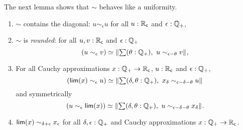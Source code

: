 The next lemma shows that $\sim$ behaves like a uniformity.

\begin{lem}\label{RC-sim-uniformity-properties}
  \mbox{}
  \begin{enumerate}

  \item \label{RC-sim-diagonal}
    $\sim$ contains the diagonal:
    $u \sim_\epsilon u$ for all $u : \mathbb{R}_\mathsf{c}$ and $\epsilon : \mathbb{Q}_{+}$,

  \item \label{RC-sim-rounded}
    $\sim$ is \emph{rounded}:
    for all $u, v : \mathbb{R}_\mathsf{c}$ and $\epsilon : \mathbb{Q}_{+}$
    \begin{equation*}
      \eqv{
        (u \sim_\epsilon v)
      }{
        \brck{\sm{\theta : \Qp} u \sim_{\epsilon - \theta} v}
      },
    \end{equation*}

  \item \label{RC-sim-lim-rounded}
    For all Cauchy approximations $x : \mathbb{Q}_{+} \to \mathbb{R}_\mathsf{c}$, $u : \mathbb{R}_\mathsf{c}$ and $\epsilon : \mathbb{Q}_{+}$,
    \begin{equation} \label{eq:RC-sim-lim-rounded-i}
      \eqv{
        (\rclim(x) \sim_\epsilon u)
      }{
        \brck{\sm{\delta, \theta : \Qp} x_\delta \sim_{\epsilon - \delta - \theta} u}
      }
    \end{equation}
    and symmetrically
    \begin{equation} \label{eq:RC-sim-lim-rounded-ii}
      \eqv{
        (u \sim_\epsilon \rclim(x))
      }{
        \brck{\sm{\delta, \theta : \Qp} u \sim_{\epsilon - \delta - \theta} x_\delta}
      }.
    \end{equation}

  \item \label{RC-sim-self}
    $\mathsf{lim}(x) \sim_{\delta + \epsilon} x_\epsilon$ for all $\delta, \epsilon : \mathbb{Q}_{+}$
    and Cauchy approximations $x : \mathbb{Q}_{+} \to \mathbb{R}_\mathsf{c}$.

  \end{enumerate}
\end{lem}

